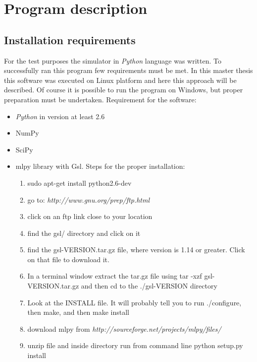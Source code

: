\appendix
\makeatletter
\def\Pref@section{Appendix~}
\def\@seccntformat#1{\csname Pref@#1\endcsname \csname the#1\endcsname\quad}
\makeatother

\section{Program description}
\label{Appendix}
\subsection{Installation requirements}
For the test purposes the simulator in \textit{Python} language was written. To
successfully ran this program few requirements must be met. In this master
thesis this software was executed on Linux platform and here this approach will
be described. Of course it is possible to run the program on Windows, but
proper preparation must be undertaken. Requirement for the software:
\begin{itemize}
    \item \textit{Python} in version at least 2.6
    \item NumPy
    \item SciPy
    \item mlpy library with Gsl. Steps for the proper installation:
        \begin{enumerate}
            \item sudo apt-get install python2.6-dev
            \item go to: \textit{http://www.gnu.org/prep/ftp.html}
            \item click on an ftp link close to your location
            \item find the gsl/ directory and click on it
            \item find the gsl-VERSION.tar.gz file, where version is 1.14 or greater. Click on that file to download it.
            \item In a terminal window extract the tar.gz file using tar -xzf gsl-VERSION.tar.gz and then cd to the ./gsl-VERSION 
                directory
            \item Look at the INSTALL file. It will probably tell you to run ./configure, then make, and then make install
            \item download mlpy from \textit{http://sourceforge.net/projects/mlpy/files/}
            \item unzip file and inside directory run from command line python setup.py install
        \end{enumerate}
\end{itemize}

